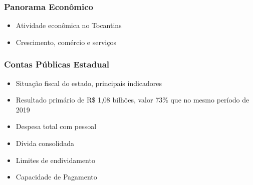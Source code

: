 \documentclass[12pt,aspectratio=169]{beamer}
\begin{document}
\begin{frame}
	\frametitle{Panorama Econômico}
	\begin{itemize}
		\item Atividade econômica no Tocantins
		\item Crescimento, comércio e serviços
	\end{itemize}
	
	\begin{figure}%
		\centering
	\end{figure}	
\end{frame}

\begin{frame}
	\frametitle{Contas Públicas Estadual}
	\begin{itemize}
		\item Situação fiscal do estado, principais indicadores
		\item Resultado primário de R\$ 1,08 bilhões, valor 73\% que no mesmo período de 2019
		\item Despesa total com pessoal
		\item Dívida consolidada
		\item Limites de endividamento
		\item Capacidade de Pagamento
	\end{itemize}
\end{frame}
\end{document}
